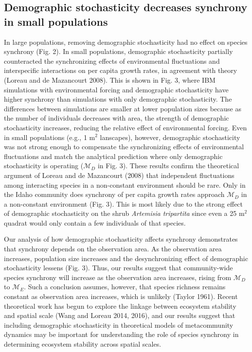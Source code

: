 \documentclass[12pt,]{article}
\begin{document}
\subsection{Demographic stochasticity decreases synchrony in small populations}

In large populations, removing demographic stochasticity had no effect
on species synchrony (Fig. 2). In small populations, demographic
stochasticity partially counteracted the synchronizing effects of
environmental fluctuations and interspecific interactions on per capita
growth rates, in agreement with theory (Loreau and {{de Mazancourt}}
2008).
This is shown in Fig. 3, where IBM simulations with environmental forcing and demographic stochasticity have higher synchrony than simulations with only demographic stochasticity.
The differences between simulations are smaller at lower population sizes because as the number of individuals decreases with area, the strength of demographic stochasticity increases, reducing the relative effect of environmental forcing.
Even in small populations
(e.g., 1 $\text{m}^2$ lanscapes), however, demographic
stochasticity was not strong enough to compensate the synchronizing
effects of environmental fluctuations and match the analytical
prediction where only demographic stochasticity is operating
(\(\mathcal{M}_D\) in Fig. 3). These results confirm the theoretical
argument of Loreau and {{de Mazancourt}} (2008) that independent
fluctuations among interacting species in a non-constant environment
should be rare. Only in the Idaho community does synchrony of per capita
growth rates approach \(\mathcal{M}_D\) in a non-constant environment
(Fig. 3). This is most likely due to the strong effect of demographic
stochasticity on the shrub \emph{Artemisia tripartita} since even a 25
\(\text{m}^2\) quadrat would only contain a few individuals of that
species.

Our analysis of how demographic stochasticity affects synchrony
demonstrates that synchrony depends on the observation area. As the
observation area increases, population size increases and the
desynchronizing effect of demographic stochasticity lessens (Fig. 3).
Thus, our results suggest that community-wide species synchrony will
increase as the observation area increases, rising from
\(\mathcal{M}_D\) to \(\mathcal{M}_E\). Such a conclusion assumes,
however, that species richness remains constant as observation area
increases, which is unlikely (Taylor 1961). Recent theoretical work has
begun to explore the linkage between ecosystem stability and spatial
scale (Wang and Loreau 2014, 2016), and our results suggest that
including demographic stochasticity in theoretical models of
metacommunity dynamics may be important for understanding the role of
species synchrony in determining ecosystem stability across spatial
scales.
\end{document}

